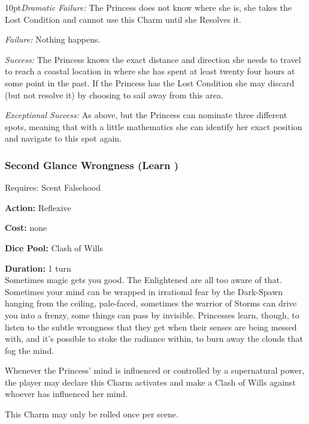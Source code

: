     \begin{myindentpar}{10pt}\emph{Dramatic Failure:} The Princess does not know where she is, she takes the Lost Condition and cannot use this Charm until she Resolves it. 

    \emph{Failure:} Nothing happens.

    \emph{Success:} The Princess knows the exact distance and direction she needs to travel to reach a coastal location in where she has spent at least twenty four hours at some point in the past. If the Princess has the Lost Condition she may discard (but not resolve it) by choosing to sail away from this area.

    \emph{Exceptional Success:}  As above, but the Princess can nominate three different spots, meaning that with a little mathematics she can identify her exact position and navigate to this spot again.\end{myindentpar}


\subsubsection*{Second Glance Wrongness (Learn \textbullet\textbullet)}

\noindent Requires: Scent Falsehood

\noindent \textbf{Action:} Reflexive

\noindent \textbf{Cost:} none

\noindent \textbf{Dice Pool:} Clash of Wills

\noindent \textbf{Duration:} 1 turn \\

\noindent Sometimes magic gets you good. The Enlightened are all too aware of that. Sometimes your mind can be wrapped in irrational fear by the Dark-Spawn hanging from the ceiling, pale-faced, sometimes the warrior of Storms can drive you into a frenzy, some things can pass by invisible. Princesses learn, though, to listen to the subtle wrongness that they get when their senses are being messed with, and it's possible to stoke the radiance within, to burn away the clouds that fog the mind.

Whenever the Princess' mind is influenced or controlled by a supernatural power, the player may declare this Charm activates and make a Clash of Wills against whoever has influenced her mind.

This Charm may only be rolled once per scene. 


